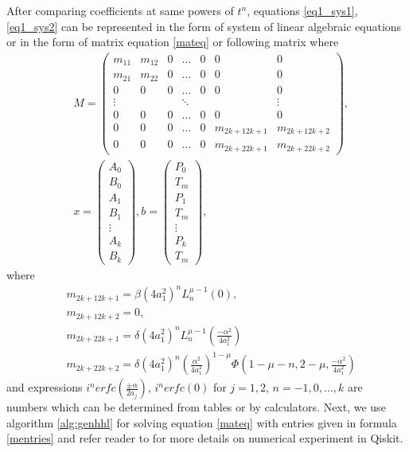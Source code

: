 \documentclass[review]{elsarticle}
\begin{document}
After comparing coefficients at same powers of $t^n$, equations \ref{eq1_sys1}, \ref{eq1_sys2} can be represented in the form of system of linear algebraic equations or in the form of matrix equation \ref{mateq} or following matrix
where
\begin{align}
&M=\begin{pmatrix}m_{11}&m_{12}&0&\dots&0&0&0\\m_{21}&m_{22}&0&\dots&0&0&0\\0&0&0&\dots&0&0&0\\\vdots&&&\ddots&&&\vdots\\0&0&0&\dots&0&0&0\\0&0&0&\dots&0&m_{2k+12k+1}&m_{2k+12k+2}\\0&0&0&\dots&0&m_{2k+22k+1}&m_{2k+2 2k+2}\end{pmatrix},\label{mentries}
\\&x=\begin{pmatrix}A_0\\B_0\\A_1\\B_1\\\vdots\\A_k\\B_k\end{pmatrix}, 
b=\begin{pmatrix} P_0\\
T_m\\
P_1\\
T_m\\\vdots\\P_k\\
T_m\end{pmatrix}\nonumber,
\end{align}
where
\begin{align*}
&m_{2k+12k+1}=\beta\left(4a_1^2\right)^n L_n^{\mu -1}\left(0\right),\\ 
&m_{2k+12k+2}=0,\\
&m_{2k+22k+1}=\delta\left(4a_1^2\right)^n L_n^{\mu -1}\left(\frac{-\alpha^2}{4a_1^2}\right)\\
&m_{2k+22k+2}= \delta\left(4a_1^2\right)^n\left( \frac{\alpha^2}{4a_1^2} \right)^{1-\mu}\Phi\left(1-\mu-n, 2-\mu,\frac{-\alpha^2}{4a_1^2}\right)
\end{align*}
and expressions $i^{n}erfc\left( \frac{\pm \alpha}{2a_{j}} \right)$, $i^{n}erfc\left( 0 \right)$ for $j=1,2$, $n=-1,0,...,k$ are numbers which can be determined from tables or by calculators. Next, we use algorithm \ref{alg:genhhl} for solving equation \ref{mateq} with entries given in formula \ref{mentries} and refer reader to \cite{SarFirst} for more details on numerical experiment in Qiskit.
\end{document}
